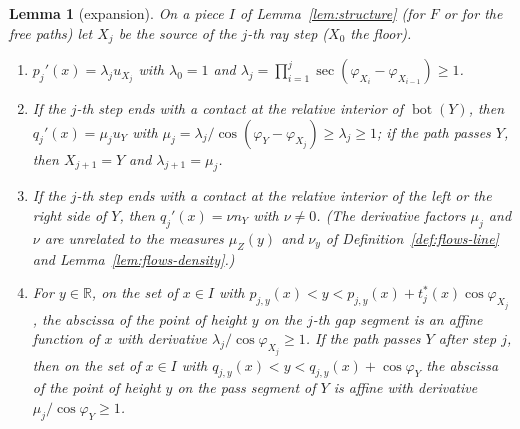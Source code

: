 \documentclass[11pt]{amsart}
\newcommand{\R}{\mathbb R}
\newcommand{\Bot}{\operatorname{bot}}
\newtheorem{lemma}[theorem]{Lemma}
\theoremstyle{definition}
\theoremstyle{remark}
\numberwithin{equation}{section}
\begin{document}
\begin{lemma}[expansion]\label{lem:expansion}
On a piece $I$ of Lemma~\ref{lem:structure} (for $F$ or for the free paths) let $X_j$ be the source of the $j$-th ray
step ($X_0$ the floor).
\begin{enumerate}[label=(\alph*)]
\item $p_j'(x)=\lambda_ju_{X_j}$ with $\lambda_0=1$ and $\lambda_j=\prod_{i=1}^j\sec(\varphi_{X_i}-\varphi_{X_{i-1}})\ge1$.
\item If the $j$-th step ends with a contact at the relative interior of $\Bot(Y)$, then $q_j'(x)=\mu_ju_Y$ with
$\mu_j=\lambda_j/\cos(\varphi_Y-\varphi_{X_j})\ge\lambda_j\ge1$; if the path passes $Y$, then $X_{j+1}=Y$ and
$\lambda_{j+1}=\mu_j$.
\item If the $j$-th step ends with a contact at the relative interior of the left or the right side of $Y$, then
$q_j'(x)=\nu n_Y$ with $\nu\ne0$. (The derivative factors $\mu_j$ and $\nu$ are unrelated to the measures $\mu_Z(y)$
and $\nu_y$ of Definition~\ref{def:flows-line} and Lemma~\ref{lem:flows-density}.)
\item For $y\in\R$, on the set of $x\in I$ with $p_{j,y}(x)<y<p_{j,y}(x)+t^*_j(x)\cos\varphi_{X_j}$, the abscissa of the
point of height $y$ on the $j$-th gap segment is an affine function of $x$ with derivative
$\lambda_j/\cos\varphi_{X_j}\ge1$. If the path passes $Y$ after step $j$, then on the set of $x\in I$ with
$q_{j,y}(x)<y<q_{j,y}(x)+\cos\varphi_Y$ the abscissa of the point of height $y$ on the pass segment of $Y$ is affine
with derivative $\mu_j/\cos\varphi_Y\ge1$.
\end{enumerate}
\end{lemma}
\end{document}
